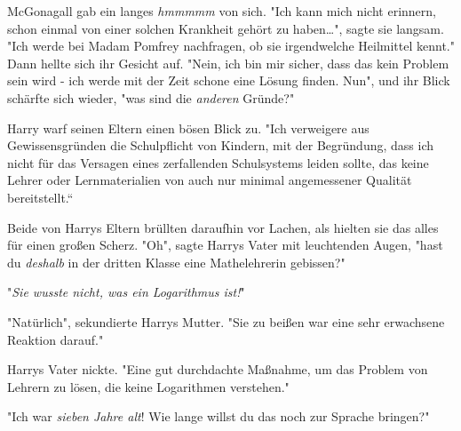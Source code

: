 McGonagall gab ein langes \emph{hmmmmm} von sich. "Ich kann mich nicht erinnern, schon einmal von einer solchen Krankheit gehört zu haben…", sagte sie langsam. "Ich werde bei Madam Pomfrey nachfragen, ob sie irgendwelche Heilmittel kennt." Dann hellte sich ihr Gesicht auf. "Nein, ich bin mir sicher, dass das kein Problem sein wird - ich werde mit der Zeit schone eine Lösung finden. Nun", und ihr Blick schärfte sich wieder, "was sind die \emph{anderen} Gründe?"

Harry warf seinen Eltern einen bösen Blick zu. "Ich verweigere aus Gewissensgründen die Schulpflicht von Kindern, mit der Begründung, dass ich nicht für das Versagen eines zerfallenden Schulsystems leiden sollte, das keine Lehrer oder Lernmaterialien von auch nur minimal angemessener Qualität bereitstellt.“

Beide von Harrys Eltern brüllten daraufhin vor Lachen, als hielten sie das alles für einen großen Scherz. "Oh", sagte Harrys Vater mit leuchtenden Augen, "hast du \emph{deshalb} in der dritten Klasse eine Mathelehrerin gebissen?"

"\emph{Sie wusste nicht, was ein Logarithmus ist!}"

"Natürlich", sekundierte Harrys Mutter. "Sie zu beißen war eine sehr erwachsene Reaktion darauf."

Harrys Vater nickte. "Eine gut durchdachte Maßnahme, um das Problem von Lehrern zu lösen, die keine Logarithmen verstehen."

"Ich war \emph{sieben Jahre alt}! Wie lange willst du das noch zur Sprache bringen?"

